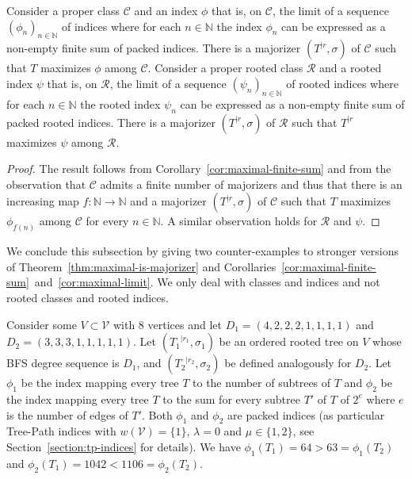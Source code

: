 \documentclass[11 pt]{modarticle}
\newcommand{\cN}{\mathbb{N}}
\newcommand{\vset}{\mathcal{V}}
\newcommand{\wmap}{w}
\newcommand{\rtree}[2]{{#1}^{\lvert #2}}
\newcommand{\ortree}[3]{(\rtree{#1}{#2},{#3})}
\newcommand{\tclass}{\mathcal{C}}
\newcommand{\rtclass}{\mathcal{R}}
\begin{document}
\begin{cor}\label{cor:maximal-limit}
Consider a proper class $\tclass$ and an index $\phi$ that is, on $\tclass$, the limit of a sequence $(\phi_n)_{n \in \cN}$ of indices where for each $n \in \cN$ the index $\phi_n$ can be expressed as a non-empty finite sum of packed indices. There is a majorizer $\ortree{T}{r}{\sigma}$ of $\tclass$ such that $T$ maximizes $\phi$ among $\tclass$. Consider a proper rooted class $\rtclass$ and a rooted index $\psi$ that is, on $\rtclass$, the limit of a sequence $(\psi_n)_{n \in \cN}$ of rooted indices where for each $n \in \cN$ the rooted index $\psi_n$ can be expressed as a non-empty finite sum of packed rooted indices. There is a majorizer $\ortree{T}{r}{\sigma}$ of $\rtclass$ such that $\rtree{T}{r}$ maximizes $\psi$ among $\rtclass$.
\end{cor}

\begin{proof}
The result follows from Corollary~\ref{cor:maximal-finite-sum} and from the observation that $\tclass$ admits a finite number of majorizers and thus that there is an increasing map $f : \cN \to \cN$ and a majorizer $\ortree{T}{r}{\sigma}$ of $\tclass$ such that $T$ maximizes $\phi_{f(n)}$ among $\tclass$ for every $n \in \cN$. A similar observation holds for $\rtclass$ and $\psi$.
\end{proof}

We conclude this subsection by giving two counter-examples to stronger versions of Theorem~\ref{thm:maximal-is-majorizer} and Corollaries~\ref{cor:maximal-finite-sum}~and~\ref{cor:maximal-limit}. We only deal with classes and indices and not rooted classes and rooted indices.

Consider some $V \subset \vset$ with 8 vertices and let $D_1 = (4, 2, 2, 2, 1, 1, 1, 1)$ and $D_2 = (3, 3, 3, 1, 1, 1, 1, 1)$. Let $\ortree{T_1}{r_1}{\sigma_1}$ be an ordered rooted tree on $V$ whose BFS degree sequence is $D_1$, and $\ortree{T_2}{r_2}{\sigma_2}$ be defined analogously for $D_2$. Let $\phi_1$ be the index mapping every tree $T$ to the number of subtrees of $T$ and $\phi_2$ be the index mapping every tree $T$ to the sum for every subtree $T'$ of $T$ of $2^e$ where $e$ is the number of edges of $T'$. Both $\phi_1$ and $\phi_2$ are packed indices (as particular Tree-Path indices with $\wmap(\vset) = \{1\}$, $\lambda = 0$ and $\mu \in \{1,2\}$, see Section~\ref{section:tp-indices} for details). We have $\phi_1(T_1) = 64 > 63 = \phi_1(T_2)$ and $\phi_2(T_1) = 1042 < 1106 = \phi_2(T_2)$.
\end{document}
